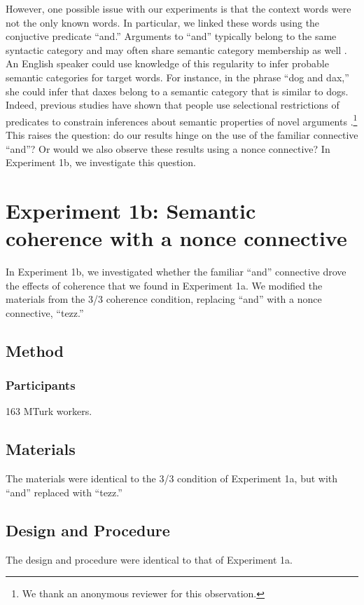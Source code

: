 \documentclass[man,floatsintext]{apa6}
\begin{document}
However, one possible issue with our experiments is that the context words were not the only known words.
In particular, we linked these words using the conjuctive predicate ``and.''
Arguments to ``and'' typically belong to the same syntactic category and may often share semantic category membership as well \cite{benor2006}.
An English speaker could use knowledge of this regularity to infer probable semantic categories for target words.
For instance, in the phrase ``dog and dax,'' she could infer that daxes belong to a semantic category that is similar to dogs.
Indeed, previous studies have shown that people use selectional restrictions of predicates to constrain inferences about semantic properties of novel arguments \citep{altmann1999, kohne2010}.\footnote{We thank an anonymous reviewer for this observation.}
This raises the question: do our results hinge on the use of the familiar connective ``and''?
Or would we also observe these results using a nonce connective?
In Experiment 1b, we investigate this question.

\section{Experiment 1b: Semantic coherence with a nonce connective}

In Experiment 1b, we investigated whether the familiar ``and'' connective drove the effects of coherence that we found in Experiment 1a. We modified the materials from the 3/3 coherence condition, replacing ``and'' with a nonce connective, ``tezz.''

\subsection{Method}

\subsubsection{Participants}
163 MTurk workers.

\subsection{Materials}
The materials were identical to the 3/3 condition of Experiment 1a, but with ``and'' replaced with ``tezz.''

\subsection{Design and Procedure}
The design and procedure were identical to that of Experiment 1a.
\end{document}
